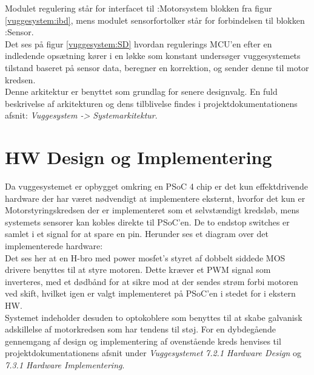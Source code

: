 Modulet regulering står for interfacet til :Motorsystem blokken fra figur \ref{vuggesystem:ibd}, mens modulet sensorfortolker står for forbindelsen til blokken :Sensor.\\

Det ses på figur \ref{vuggesystem:SD} hvordan regulerings MCU'en efter en indledende opsætning kører i en løkke som konstant undersøger vuggesystemets tilstand baseret på sensor data, beregner en korrektion, og sender denne til motor kredsen. \\

Denne arkitektur er benyttet som grundlag for senere designvalg. En fuld beskrivelse af arkitekturen og dens tilblivelse findes i projektdokumentationens afsnit: \textit{Vuggesystem -> Systemarkitektur}.\\


\section{HW Design og Implementering}
\label{vs_HW}
Da vuggesystemet er opbygget omkring en PSoC 4 chip er det kun effektdrivende hardware der har været nødvendigt at implementere eksternt, hvorfor det kun er Motorstyringskredsen der er implementeret som et selvstændigt kredsløb, mens systemets sensorer kan kobles direkte til PSoC'en. De to endstop switches er samlet i et signal for at spare en pin. Herunder ses et diagram over det implementerede hardware:\\
Det ses her at en H-bro med power mosfet's styret af dobbelt siddede MOS drivere benyttes til at styre motoren. Dette kræver et PWM signal som inverteres, med et dødbånd for at sikre mod at der sendes strøm forbi motoren ved skift, hvilket igen er valgt implementeret på PSoC'en i stedet for i ekstern HW. \\ Systemet indeholder desuden to optokoblere som benyttes til at skabe galvanisk adskillelse af motorkredsen som har tendens til støj.
For en dybdegående gennemgang af design og implementering af ovenstående kreds henvises til projektdokumentationens afsnit under \textit{Vuggesystemet} \textit{7.2.1 Hardware Design} og \textit{7.3.1 Hardware Implementering}.\\



